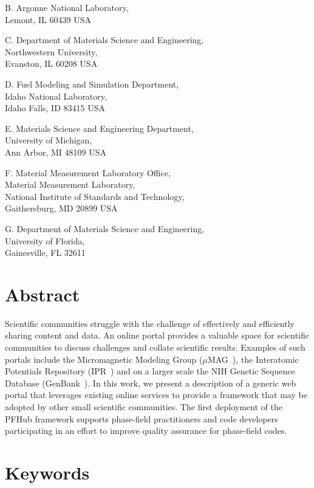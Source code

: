 \documentclass{jors}
\begin{document}
B. Argonne National Laboratory, \\
Lemont, IL 60439 USA

C. Department of Materials Science and Engineering, \\
Northwestern University, \\
Evanston, IL 60208 USA

D. Fuel Modeling and Simulation Department, \\
Idaho National Laboratory, \\
Idaho Falls, ID 83415 USA

E. Materials Science and Engineering Department, \\
University of Michigan, \\
Ann Arbor, MI 48109 USA

F. Material Measurement Laboratory Office, \\
Material Measurement Laboratory, \\
National Institute of Standards and Technology,\\
Gaithersburg, MD 20899 USA

G. Department of Materials Science and Engineering, \\
University of Florida, \\
Gainesville, FL 32611

\section*{Abstract}

Scientific communities struggle with the challenge of effectively and
efficiently sharing content and data. An online portal provides a
valuable space for scientific communities to discuss challenges and
collate scientific results. Examples of such portals include the
Micromagnetic Modeling Group ($\mu$MAG~\cite{mumag}), the Interatomic
Potentials Repository (IPR~\cite{ipr1, ipr2}) and on a larger scale
the NIH Genetic Sequence Database (GenBank~\cite{genbank}). In this
work, we present a description of a generic web portal that leverages
existing online services to provide a framework that may be adopted by
other small scientific communities. The first deployment of the PFHub
framework supports phase-field practitioners and code developers
participating in an effort to improve quality assurance for
phase-field codes.

\section*{Keywords}
\end{document}
